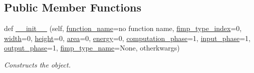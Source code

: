 \subsection*{Public Member Functions}
\begin{DoxyCompactItemize}
\item 
def \hyperlink{classsylva_1_1base_1_1fimp_1_1_f_i_m_p_cost_ae6a202c864a8f1427483d759878512aa}{\+\_\+\+\_\+init\+\_\+\+\_\+} (self, \hyperlink{classsylva_1_1base_1_1fimp_1_1_f_i_m_p_cost_afb919056ee51978896f0132907a50933}{function\+\_\+name}=\textquotesingle{}no function name\textquotesingle{}, \hyperlink{classsylva_1_1base_1_1fimp_1_1_f_i_m_p_cost_a6b12a5e2573490c298eb49479e5c5db3}{fimp\+\_\+type\+\_\+index}=0, \hyperlink{classsylva_1_1base_1_1fimp_1_1_f_i_m_p_cost_a40224d915dcc08c4d54e9ac3006047b1}{width}=0, \hyperlink{classsylva_1_1base_1_1fimp_1_1_f_i_m_p_cost_a0e40cec2324c7d0eb82f511a0925c839}{height}=0, \hyperlink{classsylva_1_1base_1_1fimp_1_1_f_i_m_p_cost_afba92218e139335948c9dcba3c9aabd4}{area}=0, \hyperlink{classsylva_1_1base_1_1fimp_1_1_f_i_m_p_cost_a7e0fcf06204dd67fb26243550fa22c68}{energy}=0, \hyperlink{classsylva_1_1base_1_1fimp_1_1_f_i_m_p_cost_a8e52dbdc89608f7d5b4da0e7538eaa0e}{computation\+\_\+phase}=1, \hyperlink{classsylva_1_1base_1_1fimp_1_1_f_i_m_p_cost_a334924c4d82dc491fbc97c8ec09058ca}{input\+\_\+phase}=1, \hyperlink{classsylva_1_1base_1_1fimp_1_1_f_i_m_p_cost_a49cd73cf2ea2a999de46e265c0346f3f}{output\+\_\+phase}=1, \hyperlink{classsylva_1_1base_1_1fimp_1_1_f_i_m_p_cost_a0e3a5e51b56d03f44bf36db9280ca535}{fimp\+\_\+type\+\_\+name}=None, otherkwargs)
\begin{DoxyCompactList}\small\item\em Constructs the object. \end{DoxyCompactList}\end{DoxyCompactItemize}
